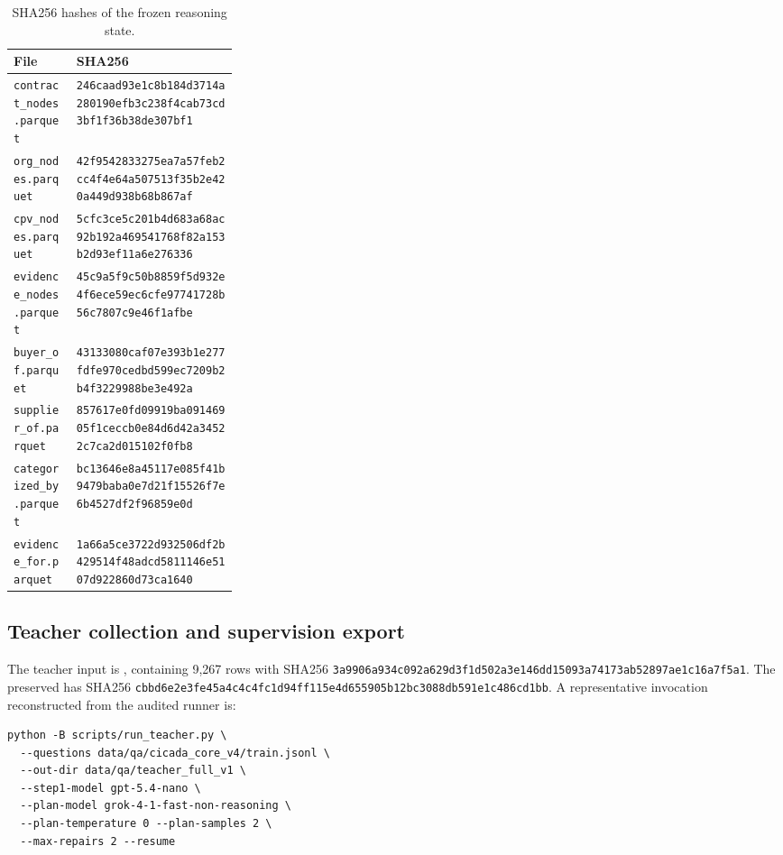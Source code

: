 \documentclass{article}
\begin{document}
\begin{table}[h]
  \centering
  \caption{SHA256 hashes of the frozen reasoning state.}
  \label{tab:artifact-hashes}
  \scriptsize
  \begin{tabularx}{\linewidth}{p{0.29\linewidth}X}
    \toprule
    File & SHA256 \\
    \midrule
    \texttt{contract\_nodes.parquet} & \nolinkurl{246caad93e1c8b184d3714a280190efb3c238f4cab73cd3bf1f36b38de307bf1} \\
    \texttt{org\_nodes.parquet} & \nolinkurl{42f9542833275ea7a57feb2cc4f4e64a507513f35b2e420a449d938b68b867af} \\
    \texttt{cpv\_nodes.parquet} & \nolinkurl{5cfc3ce5c201b4d683a68ac92b192a469541768f82a153b2d93ef11a6e276336} \\
    \texttt{evidence\_nodes.parquet} & \nolinkurl{45c9a5f9c50b8859f5d932e4f6ece59ec6cfe97741728b56c7807c9e46f1afbe} \\
    \texttt{buyer\_of.parquet} & \nolinkurl{43133080caf07e393b1e277fdfe970cedbd599ec7209b2b4f3229988be3e492a} \\
    \texttt{supplier\_of.parquet} & \nolinkurl{857617e0fd09919ba09146905f1ceccb0e84d6d42a34522c7ca2d015102f0fb8} \\
    \texttt{categorized\_by.parquet} & \nolinkurl{bc13646e8a45117e085f41b9479baba0e7d21f15526f7e6b4527df2f96859e0d} \\
    \texttt{evidence\_for.parquet} & \nolinkurl{1a66a5ce3722d932506df2b429514f48adcd5811146e5107d922860d73ca1640} \\
    \bottomrule
  \end{tabularx}
\end{table}

\subsection{Teacher collection and supervision export}

The teacher input is , containing 9,267 rows with SHA256
\nolinkurl{3a9906a934c092a629d3f1d502a3e146dd15093a74173ab52897ae1c16a7f5a1}.  The preserved
 has SHA256
\nolinkurl{cbbd6e2e3fe45a4c4c4fc1d94ff115e4d655905b12bc3088db591e1c486cd1bb}.  A representative
invocation reconstructed from the audited runner is:

\begin{verbatim}
python -B scripts/run_teacher.py \
  --questions data/qa/cicada_core_v4/train.jsonl \
  --out-dir data/qa/teacher_full_v1 \
  --step1-model gpt-5.4-nano \
  --plan-model grok-4-1-fast-non-reasoning \
  --plan-temperature 0 --plan-samples 2 \
  --max-repairs 2 --resume
\end{verbatim}
\end{document}
